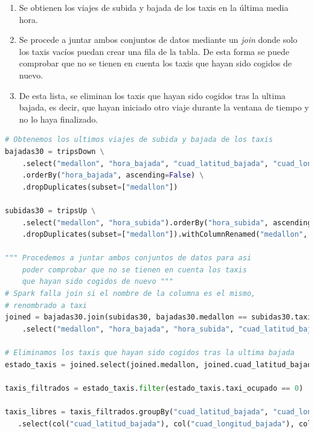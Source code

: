 \begin{enumerate}
\item Se obtienen los viajes de subida y bajada de los taxis en la última media hora.

\item Se procede a juntar ambos conjuntos de datos mediante un \textit{join} donde solo los taxis vacíos puedan crear una fila de la tabla. De esta forma se puede comprobar que no se tienen en cuenta los taxis que hayan sido cogidos de nuevo.

\item De esta lista, se eliminan los taxis que hayan sido cogidos tras la ultima bajada, es decir, que hayan iniciado otro viaje durante la ventana de tiempo y no lo haya finalizado.
\end{enumerate}

\clearpage
\begin{lstlisting}[label=taxisVacios,language=Python,frame=single,caption=Código para obtener los taxis vacíos en las zonas de la ciudad durante la última media hora]
# Obtenemos los ultimos viajes de subida y bajada de los taxis
bajadas30 = tripsDown \
    .select("medallon", "hora_bajada", "cuad_latitud_bajada", "cuad_longitud_bajada") \
    .orderBy("hora_bajada", ascending=False) \
    .dropDuplicates(subset=["medallon"])

subidas30 = tripsUp \
    .select("medallon", "hora_subida").orderBy("hora_subida", ascending=False) \
    .dropDuplicates(subset=["medallon"]).withColumnRenamed("medallon", "taxi")

""" Procedemos a juntar ambos conjuntos de datos para asi
    poder comprobar que no se tienen en cuenta los taxis
    que hayan sido cogidos de nuevo """
# Spark falla join si el nombre de la columna es el mismo,
# renombrado a taxi
joined = bajadas30.join(subidas30, bajadas30.medallon == subidas30.taxi, "leftouter") \
    .select("medallon", "hora_bajada", "hora_subida", "cuad_latitud_bajada", "cuad_longitud_bajada")

# Eliminamos los taxis que hayan sido cogidos tras la ultima bajada
estado_taxis = joined.select(joined.medallon, joined.cuad_latitud_bajada, joined.cuad_longitud_bajada, when(joined.hora_subida > joined.hora_bajada, 1).otherwise(0).alias("taxi_ocupado"))
    
taxis_filtrados = estado_taxis.filter(estado_taxis.taxi_ocupado == 0)

taxis_libres = taxis_filtrados.groupBy("cuad_latitud_bajada", "cuad_longitud_bajada").count() \
   .select(col("cuad_latitud_bajada"), col("cuad_longitud_bajada"), col("count").alias("taxis_libres"))
\end{lstlisting}

